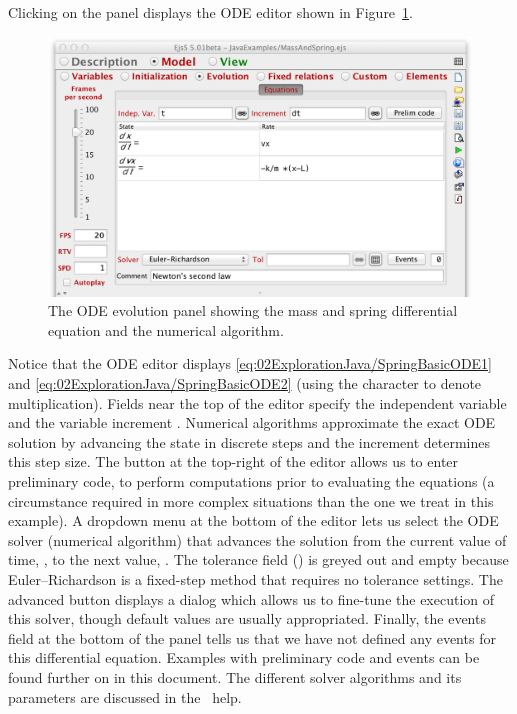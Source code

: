 Clicking on the  panel displays the ODE editor shown in
Figure~\ref{fig:02ExplorationJava/ModelEvolution}.
\begin{figure}[htb]
    \centering
  \includegraphics[scale=\scale]{02ExplorationJava/images/ModelEvolution.png}
    \caption{The ODE evolution panel showing the mass and spring differential equation and the numerical algorithm.}
    \label{fig:02ExplorationJava/ModelEvolution}
\end{figure}
Notice that the ODE editor displays \eqref{eq:02ExplorationJava/SpringBasicODE1} and \eqref{eq:02ExplorationJava/SpringBasicODE2}
(using the  \lit{*} character to denote multiplication). Fields near the top of the editor specify the independent variable
 and the variable increment .  Numerical algorithms approximate the exact ODE solution by advancing
the state in discrete steps and the increment determines this step size.
The  button at the top-right of the editor allows us to enter preliminary code, to perform computations prior to evaluating the equations (a circumstance required in more complex situations than the one we treat in this example). A dropdown menu at the bottom of the editor
lets us select the ODE solver (numerical algorithm) that advances the solution from the current value of time, , to the next value, . The tolerance field () is greyed out and empty because Euler--Richardson is a fixed-step method that requires no tolerance settings. The advanced button displays a dialog which allows us to fine-tune the execution of this solver, though default values are usually appropriated. Finally, the events field at the bottom of the panel tells us that we have not defined any events for this differential equation. Examples with preliminary code and events can be found further on in this document. The different solver algorithms and its parameters are discussed in the \ejs\ help.

